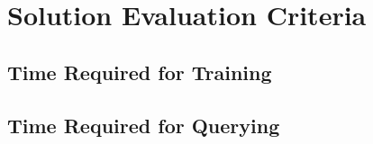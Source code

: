 


\section{Solution Evaluation Criteria}



\subsection{Time Required for Training}





\subsection{Time Required for Querying}



